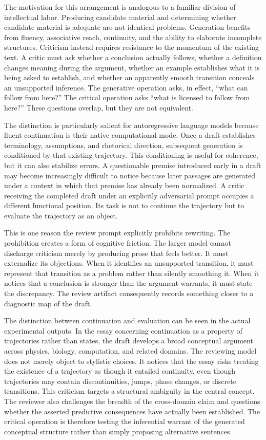 \documentclass[11pt]{article}
\begin{document}
The motivation for this arrangement is analogous to a familiar division of intellectual labor. Producing candidate material and determining whether candidate material is adequate are not identical problems. Generation benefits from fluency, associative reach, continuity, and the ability to elaborate incomplete structures. Criticism instead requires resistance to the momentum of the existing text. A critic must ask whether a conclusion actually follows, whether a definition changes meaning during the argument, whether an example establishes what it is being asked to establish, and whether an apparently smooth transition conceals an unsupported inference. The generative operation asks, in effect, ``what can follow from here?'' The critical operation asks ``what is licensed to follow from here?'' These questions overlap, but they are not equivalent.

The distinction is particularly salient for autoregressive language models because fluent continuation is their native computational mode. Once a draft establishes terminology, assumptions, and rhetorical direction, subsequent generation is conditioned by that existing trajectory. This conditioning is useful for coherence, but it can also stabilize errors. A questionable premise introduced early in a draft may become increasingly difficult to notice because later passages are generated under a context in which that premise has already been normalized. A critic receiving the completed draft under an explicitly adversarial prompt occupies a different functional position. Its task is not to continue the trajectory but to evaluate the trajectory as an object.

This is one reason the review prompt explicitly prohibits rewriting. The prohibition creates a form of cognitive friction. The larger model cannot discharge criticism merely by producing prose that feels better. It must externalize its objections. When it identifies an unsupported transition, it must represent that transition as a problem rather than silently smoothing it. When it notices that a conclusion is stronger than the argument warrants, it must state the discrepancy. The review artifact consequently records something closer to a diagnostic map of the draft.

The distinction between continuation and evaluation can be seen in the actual experimental outputs. In the essay concerning continuation as a property of trajectories rather than states, the draft develops a broad conceptual argument across physics, biology, computation, and related domains. The reviewing model does not merely object to stylistic choices. It notices that the essay risks treating the existence of a trajectory as though it entailed continuity, even though trajectories may contain discontinuities, jumps, phase changes, or discrete transitions. This criticism targets a structural ambiguity in the central concept. The reviewer also challenges the breadth of the cross-domain claim and questions whether the asserted predictive consequences have actually been established. The critical operation is therefore testing the inferential warrant of the generated conceptual structure rather than simply proposing alternative sentences.
\end{document}
